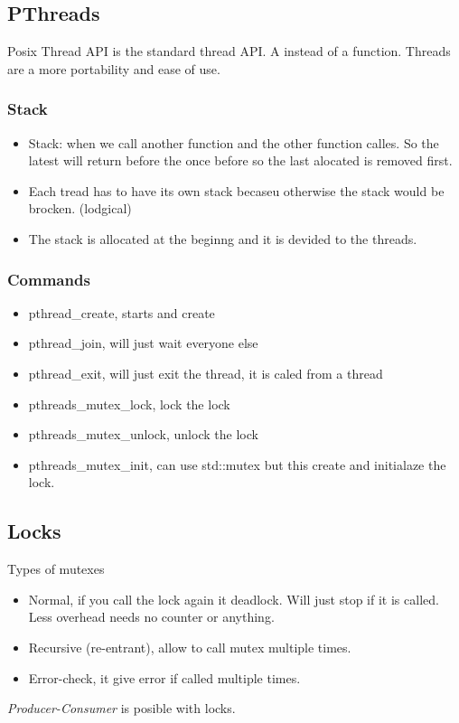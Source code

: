 \subsection{PThreads}
Posix Thread API is the standard thread API. A instead of a function.
Threads are a more portability and ease of use.

\subsubsection{Stack}
\begin{itemize}
\item Stack: when we call another function and the other function calles. So the latest will return before the once before so the last alocated is removed first.
\item Each tread has to have its own stack becaseu otherwise the stack would be brocken. (lodgical)
\item The stack is allocated at the beginng and it is devided to the threads.
\end{itemize}

\subsubsection{Commands}
\begin{itemize}
\item pthread\_create, starts and create
\item pthread\_join, will just wait everyone else
\item pthread\_exit, will just exit the thread, it is caled from a thread
\end{itemize}
\begin{itemize}
\item pthreads\_mutex\_lock, lock the lock
\item pthreads\_mutex\_unlock, unlock the lock
\item pthreads\_mutex\_init, can use std::mutex but this create and initialaze the lock.
\end{itemize}

\subsection{Locks}
Types of mutexes
\begin{itemize}
\item Normal, if you call the lock again it deadlock. Will just stop if it is called. Less overhead needs no counter or anything.
\item Recursive (re-entrant), allow to call mutex multiple times.
\item Error-check, it give error if called multiple times.
\end{itemize}
\textit{Producer-Consumer} is posible with locks.

